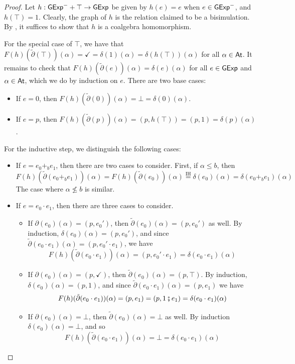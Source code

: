 \documentclass[orivec,envcountsect,envcountsame]{llncs}
\begin{document}
\restateembedexpmorphism*
\begin{proof}
    Let \(h: \mathsf{GExp}^- + \top \to \mathsf{GExp}\) be given by \(h(e) = e\) when \(e \in \mathsf{GExp}^-\), and \(h(\top) = 1\).
    Clearly, the graph of \(h\) is the relation claimed to be a bisimulation.
    By , it suffices to show that \(h\) is a coalgebra homomorphism.

	For the special case of $\top$, we have that $F(h)(\tilde{\partial}(\top))(\alpha) = \checkmark = \delta(1)(\alpha) = \delta(h(\top))(\alpha)$ for all $\alpha \in \mathsf{At}$.
	It remains to check that $F(h)(\tilde{\partial}(e))(\alpha) = \delta(e)(\alpha)$ for all $e \in \mathsf{GExp}$ and $\alpha \in \mathsf{At}$, which we do by induction on $e$.
    There are two base cases:
	\begin{itemize}
		\item
		If $e = 0$, then $F(h)(\tilde{\partial}(0))(\alpha) = \bot = \delta(0)(\alpha)$.

		\item
		If $e = p$, then $F(h)(\tilde{\partial}(p))(\alpha) = (p, h(\top)) = (p, 1) = \delta(p)(\alpha)$.
    \end{itemize}
    For the inductive step, we distinguish the following cases:
    \begin{itemize}
		\item
		If $e = e_0 +_b e_1$, then there are two cases to consider.
		First, if $\alpha \leq b$, then
		\[
		F(h)(\tilde{\partial}(e_0 +_b e_1))(\alpha)
		= F(h)(\tilde{\partial}(e_0))(\alpha)
		\stackrel{\text{IH}}{=} \delta(e_0)(\alpha)
		= \delta(e_0 +_b e_1)(\alpha)
		\]
		The case where $\alpha \not\leq b$ is similar.

		\item
		If $e = e_0 \cdot e_1$, then there are three cases to consider.
		\begin{itemize}
			\item
			If $\partial(e_0)(\alpha) = (p, e_0')$, then $\tilde{\partial}(e_0)(\alpha) = (p, e_0')$ as well.
			By induction, $\delta(e_0)(\alpha) = (p, e_0')$, and since $\tilde{\partial}(e_0 \cdot e_1)(\alpha) = (p, e_0' \cdot e_1)$, we have
			\[
			F(h)(\tilde{\partial}(e_0 \cdot e_1))(\alpha)
			= (p, e_0' \cdot e_1)
			= \delta(e_0 \cdot e_1)(\alpha)
			\]
			\item
			If $\partial(e_0)(\alpha) = (p, \checkmark)$, then $\tilde{\partial}(e_0)(\alpha) = (p, \top)$.
			By induction, $\delta(e_0)(\alpha) = (p, 1)$, and since $\tilde{\partial}(e_0 \cdot e_1)(\alpha) = (p, e_1)$ we have
			\[
			F(h)(\tilde{\partial}(e_0 \cdot e_1))(\alpha)
			= (p, e_1)
			= (p, 1 \fatsemi e_1)
			= \delta(e_0 \cdot e_1)(\alpha)
			\]
			\item
			If $\partial(e_0)(\alpha) = \bot$, then $\tilde{\partial}(e_0)(\alpha) = \bot$ as well.
			By induction $\delta(e_0)(\alpha) = \bot$, and so
			\[
			F(h)(\tilde{\partial}(e_0 \cdot e_1))(\alpha)
			= \bot
			= \delta(e_0 \cdot e_1)(\alpha)
			\]
		\end{itemize}


\end{itemize}
\end{proof}
\end{document}
